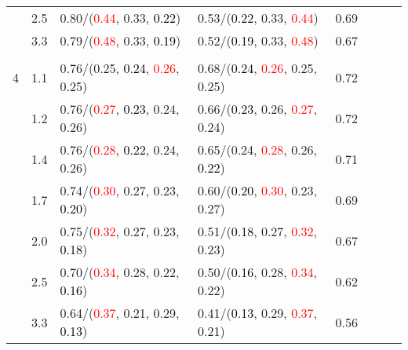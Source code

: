\documentclass[10pt,a4paper]{report}
\begin{document}
\begin{table}[!htbp]
\begin{center}
{\begin{tabular}{ccllcccc}
			&2.5&0.80/(\textcolor{red}{0.44}, 0.33, \textcolor{black}{0.22})&0.53/(\textcolor{black}{0.22}, 0.33, \textcolor{red}{0.44})&0.69\\
			&3.3&0.79/(\textcolor{red}{0.48}, 0.33, \textcolor{black}{0.19})&0.52/(\textcolor{black}{0.19}, 0.33, \textcolor{red}{0.48})&0.67\\
			&&&&\\
			4			&1.1&0.76/(0.25, \textcolor{black}{0.24}, \textcolor{red}{0.26}, 0.25)&0.68/(\textcolor{black}{0.24}, \textcolor{red}{0.26}, 0.25, 0.25)&0.72\\
			&1.2&0.76/(\textcolor{red}{0.27}, \textcolor{black}{0.23}, 0.24, 0.26)&0.66/(\textcolor{black}{0.23}, 0.26, \textcolor{red}{0.27}, 0.24)&0.72\\
			&1.4&0.76/(\textcolor{red}{0.28}, \textcolor{black}{0.22}, 0.24, 0.26)&0.65/(0.24, \textcolor{red}{0.28}, 0.26, \textcolor{black}{0.22})&0.71\\
			&1.7&0.74/(\textcolor{red}{0.30}, 0.27, 0.23, \textcolor{black}{0.20})&0.60/(\textcolor{black}{0.20}, \textcolor{red}{0.30}, 0.23, 0.27)&0.69\\
			&2.0&0.75/(\textcolor{red}{0.32}, 0.27, 0.23, \textcolor{black}{0.18})&0.51/(\textcolor{black}{0.18}, 0.27, \textcolor{red}{0.32}, 0.23)&0.67\\
			&2.5&0.70/(\textcolor{red}{0.34}, 0.28, 0.22, \textcolor{black}{0.16})&0.50/(\textcolor{black}{0.16}, 0.28, \textcolor{red}{0.34}, 0.22)&0.62\\
			&3.3&0.64/(\textcolor{red}{0.37}, 0.21, 0.29, \textcolor{black}{0.13})&0.41/(\textcolor{black}{0.13}, 0.29, \textcolor{red}{0.37}, 0.21)&0.56\\
			\bottomrule
		\end{tabular}}
	\end{center}
\end{table}
\end{document}

